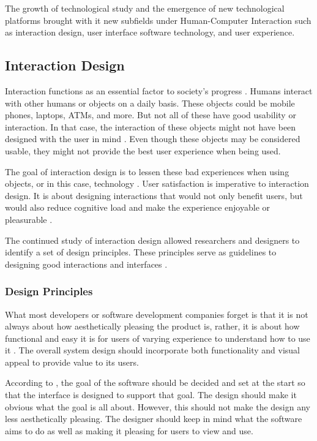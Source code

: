     The growth of technological study and the emergence of new technological platforms brought with it new subfields under Human-Computer Interaction such as interaction design, user interface software technology, and user experience.
    
	\subsection{Interaction Design}
    
    Interaction functions as an essential factor to society's progress \citep{rogers2011interaction}. Humans interact with other humans or objects on a daily basis. These objects could be mobile phones, laptops, ATMs, and more. But not all of these have good usability or interaction. In that case, the interaction of these objects might not have been designed with the user in mind \citep{rogers2011interaction}. Even though these objects may be considered usable, they might not provide the best user experience when being used. 
    
    The goal of interaction design is to lessen these bad experiences when using objects, or in this case, technology \citep{shedroff1999information,rogers2011interaction}. User satisfaction is imperative to interaction design. It is about designing interactions that would not only benefit users, but would also reduce cognitive load and make the experience enjoyable or pleasurable \citep{tidwell2010designing}. 
    
    The continued study of interaction design allowed researchers and designers to identify a set of design principles. These principles serve as guidelines to designing good interactions and interfaces \citep{rogers2011interaction}. 

	\subsubsection{Design Principles}
    \label{sec:designprinciples}
    
    	What most developers or software development companies forget is that it is not always about how aesthetically pleasing the product is, rather, it is about how functional and easy it is for users of varying experience to understand how to use it \citep{blair2008user}. The overall system design should incorporate both functionality and visual appeal to provide value to its users.
        
        According to \citet{blair2008user}, the goal of the software should be decided and set at the start so that the interface is designed to support that goal. The design should make it obvious what the goal is all about. However, this should not make the design any less aesthetically pleasing. The designer should keep in mind what the software aims to do as well as making it pleasing for users to view and use. 
        
